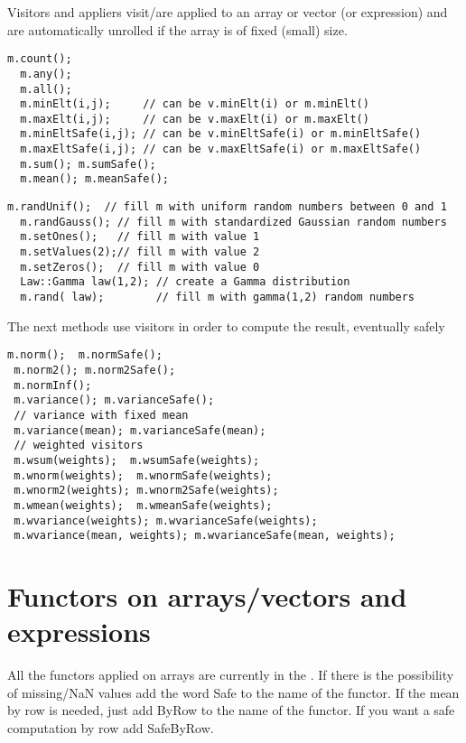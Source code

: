\documentclass[a4paper,10pt]{article}
\begin{document}
Visitors and appliers visit/are applied to an array or vector (or expression)
and are automatically unrolled if the array is of fixed (small) size.

\begin{lstlisting}[style=customcpp,caption=Visitors]
  m.count();
  m.any();
  m.all();
  m.minElt(i,j);     // can be v.minElt(i) or m.minElt()
  m.maxElt(i,j);     // can be v.maxElt(i) or m.maxElt()
  m.minEltSafe(i,j); // can be v.minEltSafe(i) or m.minEltSafe()
  m.maxEltSafe(i,j); // can be v.maxEltSafe(i) or m.maxEltSafe()
  m.sum(); m.sumSafe();
  m.mean(); m.meanSafe();
\end{lstlisting}

\begin{lstlisting}[style=customcpp,caption=Appliers]
  m.randUnif();  // fill m with uniform random numbers between 0 and 1
  m.randGauss(); // fill m with standardized Gaussian random numbers
  m.setOnes();   // fill m with value 1
  m.setValues(2);// fill m with value 2
  m.setZeros();  // fill m with value 0
  Law::Gamma law(1,2); // create a Gamma distribution
  m.rand( law);        // fill m with gamma(1,2) random numbers
\end{lstlisting}

The next methods use visitors in order to compute the result, eventually safely
\begin{lstlisting}[style=customcpp]
 m.norm();  m.normSafe();
 m.norm2(); m.norm2Safe();
 m.normInf();
 m.variance(); m.varianceSafe();
 // variance with fixed mean
 m.variance(mean); m.varianceSafe(mean);
 // weighted visitors
 m.wsum(weights);  m.wsumSafe(weights);
 m.wnorm(weights);  m.wnormSafe(weights);
 m.wnorm2(weights); m.wnorm2Safe(weights);
 m.wmean(weights);  m.wmeanSafe(weights);
 m.wvariance(weights); m.wvarianceSafe(weights);
 m.wvariance(mean, weights); m.wvarianceSafe(mean, weights);
\end{lstlisting}

\section{Functors on arrays/vectors and expressions}

All the functors applied on arrays are currently in the .
If there is the possibility of missing/NaN values add the word
Safe to the name of the functor. If the mean by row is needed, just add ByRow
to the name of the functor. If you want a safe computation by row add SafeByRow.
\end{document}
